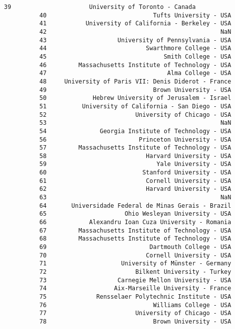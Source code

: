 \documentclass[11pt]{article}
\begin{document}
\begin{Verbatim}[commandchars=\\\{\}]
          39                      University of Toronto - Canada   
          40                              Tufts University - USA   
          41           University of California - Berkeley - USA   
          42                                                 NaN   
          43                    University of Pennsylvania - USA   
          44                            Swarthmore College - USA   
          45                                 Smith College - USA   
          46         Massachusetts Institute of Technology - USA   
          47                                  Alma College - USA   
          48     University of Paris VII: Denis Diderot - France   
          49                              Brown University - USA   
          50             Hebrew University of Jerusalem - Israel   
          51          University of California - San Diego - USA   
          52                         University of Chicago - USA   
          53                                                 NaN   
          54               Georgia Institute of Technology - USA   
          56                          Princeton University - USA   
          57         Massachusetts Institute of Technology - USA   
          58                            Harvard University - USA   
          59                               Yale University - USA   
          60                           Stanford University - USA   
          61                            Cornell University - USA   
          62                            Harvard University - USA   
          63                                                 NaN   
          64       Universidade Federal de Minas Gerais - Brazil   
          65                      Ohio Wesleyan University - USA   
          66            Alexandru Ioan Cuza University - Romania   
          67         Massachusetts Institute of Technology - USA   
          68         Massachusetts Institute of Technology - USA   
          69                             Dartmouth College - USA   
          70                            Cornell University - USA   
          71                     University of Münster - Germany   
          72                         Bilkent University - Turkey   
          73                    Carnegie Mellon University - USA   
          74                   Aix-Marseille University - France   
          75              Rensselaer Polytechnic Institute - USA   
          76                              Williams College - USA   
          77                         University of Chicago - USA   
          78                              Brown University - USA   

\end{Verbatim}
\end{document}
